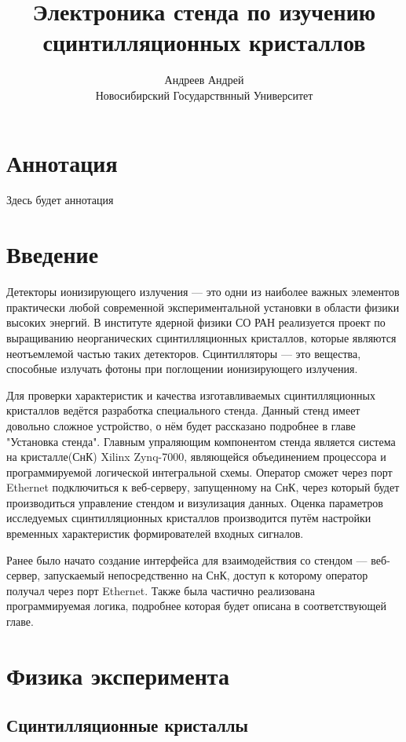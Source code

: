 \documentclass[a4paper, 12pt]{article}
\title{Электроника стенда по изучению сцинтилляционных кристаллов}
\author{Андреев Андрей\\Новосибирский Государствнный Университет}
\begin{document}
\maketitle
\newpage

\section*{Аннотация}
Здесь будет аннотация
\newpage

\tableofcontents
\newpage

\section{Введение}
Детекторы ионизирующего излучения --- это одни из наиболее важных элементов практически любой современной экспериментальной установки в области физики высоких энергий. В институте ядерной физики СО РАН реализуется проект по выращиванию неорганических сцинтилляционных кристаллов, которые являются неотъемлемой частью таких детекторов. Сцинтилляторы --- это вещества, способные излучать фотоны при поглощении ионизирующего излучения.\par
Для проверки характеристик и качества изготавливаемых сцинтилляционных кристаллов ведётся разработка специального стенда. Данный стенд имеет довольно сложное устройство, о нём будет рассказано подробнее в главе "Установка стенда". Главным упраляющим компонентом стенда является система на кристалле(СнК) Xilinx Zynq-7000, являющейся объединением процессора и программируемой логической интегральной схемы. Оператор сможет через порт Ethernet подключиться к веб-серверу, запущенному на СнК, через который будет производиться управление стендом и визулизация данных. Оценка параметров исследуемых сцинтилляционных кристаллов производится путём настройки временных характеристик формирователей входных сигналов.\par
Ранее было начато создание интерфейса для взаимодействия со стендом --- веб-сервер, запускаемый непосредственно на СнК, доступ к которому оператор получал через порт Ethernet. Также была частично реализована программируемая логика, подробнее которая будет описана в соответствующей главе.\par

\section{Физика эксперимента}
    \subsection{Сцинтилляционные кристаллы}
    
\end{document}

